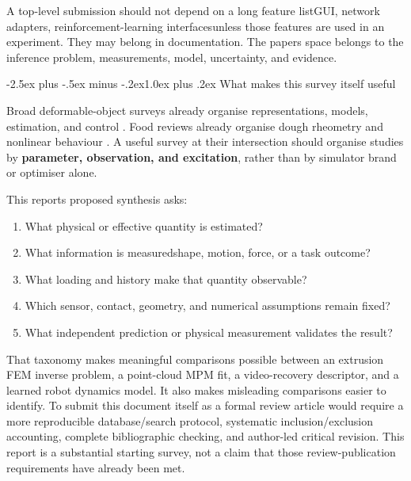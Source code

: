 \documentclass[
  11pt,
]{article}
\makeatletter
\providecommand{\tightlist}{%
  \setlength{\itemsep}{0pt}\setlength{\parskip}{0pt}}
\renewcommand\subsection{\needspace{5\baselineskip}\@startsection{subsection}{2}{\z@}%
  {-2.5ex plus -.5ex minus -.2ex}{1.0ex plus .2ex}%
  {\normalfont\sffamily\large\bfseries\color{accent}}}
\makeatother
\begin{document}
A top-level submission should not depend on a long feature
list\textemdash{}\allowbreak{}GUI, network adapters,
reinforcement-learning interfaces\textemdash{}\allowbreak{}unless those
features are used in an experiment. They may belong in documentation.
The paper\textquotesingle s space belongs to the inference problem,
measurements, model, uncertainty, and evidence.

\subsection{What makes this survey itself
useful}\label{what-makes-this-survey-itself-useful}

Broad deformable-object surveys already organise representations,
models, estimation, and control . Food
reviews already organise dough rheometry and nonlinear behaviour
. A useful survey at their intersection
should organise studies by \textbf{parameter, observation, and
excitation}, rather than by simulator brand or optimiser alone.

This report\textquotesingle s proposed synthesis asks:

\begin{enumerate}
\def\labelenumi{\arabic{enumi}.}
\tightlist
\item
  What physical or effective quantity is estimated?
\item
  What information is measured\textemdash{}\allowbreak{}shape, motion,
  force, or a task outcome?
\item
  What loading and history make that quantity observable?
\item
  Which sensor, contact, geometry, and numerical assumptions remain
  fixed?
\item
  What independent prediction or physical measurement validates the
  result?
\end{enumerate}

That taxonomy makes meaningful comparisons possible between an extrusion
FEM inverse problem, a point-cloud MPM fit, a video-recovery descriptor,
and a learned robot dynamics model. It also makes misleading comparisons
easier to identify. To submit this document itself as a formal review
article would require a more reproducible database/search protocol,
systematic inclusion/exclusion accounting, complete bibliographic
checking, and author-led critical revision. This report is a substantial
starting survey, not a claim that those review-publication requirements
have already been met.
\end{document}

